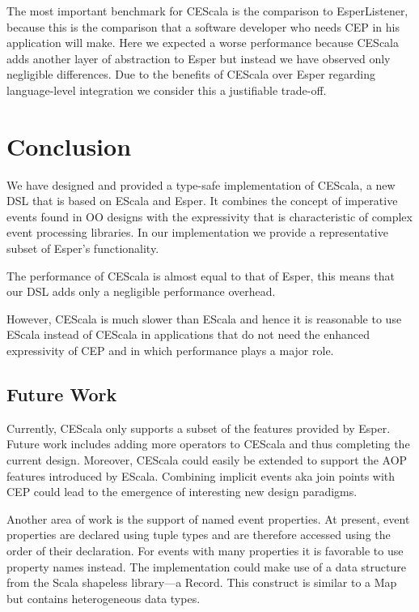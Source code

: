 \documentclass[book,type=bsc,colorback,accentcolor=tud8b,12pt,twoside]{tudthesis}
\renewcommand*{\lstlistlistingname}{List of Listings}
\renewcommand{\lstlistoflistings}{\begingroup
\tocfile{\lstlistlistingname}{lol}
\endgroup}
\begin{document}
The most important benchmark for CEScala is the comparison to EsperListener, because this is the comparison that a software developer who needs CEP in his application will make.  Here we expected a worse performance because CEScala adds another layer of abstraction to Esper but instead we have observed only negligible differences.  Due to the benefits of CEScala over Esper regarding language-level integration we consider this a justifiable trade-off.  



\chapter{Conclusion}
\label{sec:conclusion}

We have designed and provided a type-safe implementation of CEScala, a new DSL that is based on EScala and Esper.  It combines the concept of imperative events found in OO designs with the expressivity that is characteristic of complex event processing libraries.  In our implementation we provide a representative subset of Esper's functionality.  

The performance of CEScala is almost equal to that of Esper, this means that our DSL adds only a negligible performance overhead.  

However, CEScala is much slower than EScala and hence it is reasonable to use EScala instead of CEScala in applications that do not need the enhanced expressivity of CEP and in which performance plays a major role.  

\section{Future Work}
\label{future-work}

Currently, CEScala only supports a subset of the features provided by Esper.  Future work includes adding more operators to CEScala and thus completing the current design.  Moreover, CEScala could easily be extended to support the AOP features introduced by EScala.  Combining implicit events aka join points with CEP could lead to the emergence of interesting new design paradigms.  

Another area of work is the support of named event properties.  At present, event properties are declared using tuple types and are therefore accessed using the order of their declaration.  For events with many properties it is favorable to use property names instead.  The implementation could make use of a data structure from the Scala shapeless library---a Record.  This construct is similar to a Map but contains heterogeneous data types.  

\backmatter
\printbibliography[heading=bibintoc]
\end{document}
